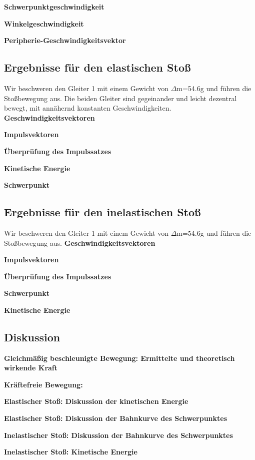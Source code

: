 \documentclass{article}
\begin{document}
\textbf{Schwerpunktgeschwindigkeit}

\textbf{Winkelgeschwindigkeit}

\textbf{Peripherie-Geschwindigkeitsvektor}


\subsection{Ergebnisse für den elastischen Stoß}

Wir beschweren den Gleiter 1 mit einem Gewicht von $\Delta$m=54.6g und führen die Stoßbewegung aus. Die beiden Gleiter sind gegeinander und leicht dezentral bewegt, mit annähernd konstanten Geschwindigkeiten.
\textbf{Geschwindigkeitsvektoren}

\textbf{Impulsvektoren}

\textbf{Überprüfung des Impulssatzes}

\textbf{Kinetische Energie}

\textbf{Schwerpunkt}


\subsection{Ergebnisse für den inelastischen Stoß}
Wir beschweren den Gleiter 1 mit einem Gewicht von $\Delta$m=54.6g und führen die Stoßbewegung aus.
\textbf{Geschwindigkeitsvektoren}

\textbf{Impulsvektoren}

\textbf{Überprüfung des Impulssatzes}

\textbf{Schwerpunkt}

\textbf{Kinetische Energie}




\subsection{Diskussion}
\textbf{Gleichmäßig beschleunigte Bewegung: Ermittelte und theoretisch wirkende Kraft}


\textbf{Kräftefreie Bewegung: }


\textbf{Elastischer Stoß: Diskussion der kinetischen Energie}

\textbf{Elastischer Stoß: Diskussion der Bahnkurve des Schwerpunktes}


\textbf{Inelastischer Stoß: Diskussion der Bahnkurve des Schwerpunktes}

\textbf{Inelastischer Stoß: Kinetische Energie}
\end{document}
